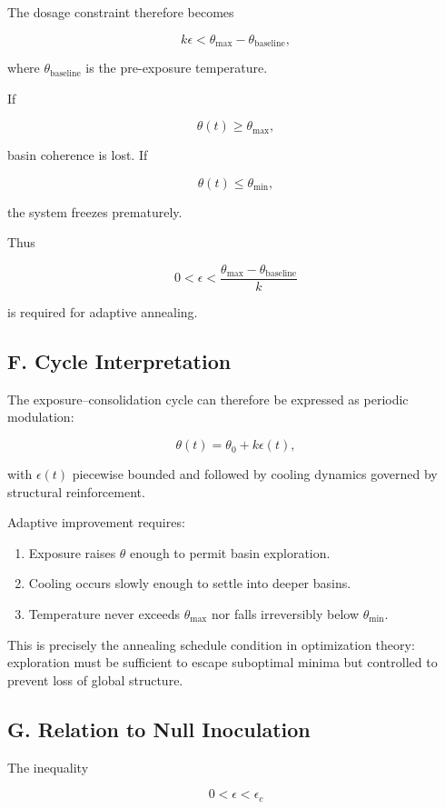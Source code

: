 \documentclass[11pt]{article}
\theoremstyle{remark}
\begin{document}
The dosage constraint therefore becomes

\[
k \epsilon < \theta_{\max} - \theta_{\text{baseline}},
\]

where $\theta_{\text{baseline}}$ is the pre-exposure temperature.

If

\[
\theta(t) \ge \theta_{\max},
\]

basin coherence is lost. If

\[
\theta(t) \le \theta_{\min},
\]

the system freezes prematurely.

Thus

\[
0 < \epsilon < \frac{\theta_{\max} - \theta_{\text{baseline}}}{k}
\]

is required for adaptive annealing.

\subsection*{F. Cycle Interpretation}

The exposure--consolidation cycle can therefore be expressed as periodic modulation:

\[
\theta(t)
=
\theta_0
+
k \epsilon(t),
\]

with $\epsilon(t)$ piecewise bounded and followed by cooling dynamics governed by structural reinforcement.

Adaptive improvement requires:

\begin{enumerate}
\item Exposure raises $\theta$ enough to permit basin exploration.
\item Cooling occurs slowly enough to settle into deeper basins.
\item Temperature never exceeds $\theta_{\max}$ nor falls irreversibly below $\theta_{\min}$.
\end{enumerate}

This is precisely the annealing schedule condition in optimization theory: exploration must be sufficient to escape suboptimal minima but controlled to prevent loss of global structure.

\subsection*{G. Relation to Null Inoculation}

The inequality

\[
0 < \epsilon < \epsilon_c
\]
\end{document}
